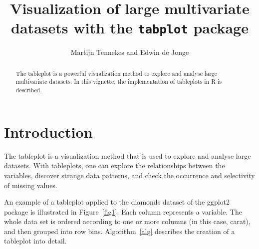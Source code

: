 \documentclass[11pt, fleqn, a4paper]{article}
\title{Visualization of large multivariate datasets with the {\tt tabplot} package}
\author{Martijn Tennekes and Edwin de Jonge}
\begin{document}

\maketitle
\begin{abstract}

The tableplot is a powerful visualization method to explore and analyse large multivariate datasets. In this vignette, the implementation of tableplots in R is described. 


\end{abstract}

\maketitle


\section{Introduction}
The tableplot is a visualization method that is used to explore and analyse large datasets. With tableplots, one can explore the relationships between the variables, discover strange data patterns, and check the occurrence and selectivity of missing values. 

An example of a tableplot applied to the diamonds dataset of the ggplot2 package is illustrated in Figure~\ref{fig1}. Each column represents a variable. The whole data set is ordered according to one or more columns (in this case, carat), and then grouped into row bins. Algorithm~\ref{alg} describes the creation of a tableplot into detail.
\end{document}
